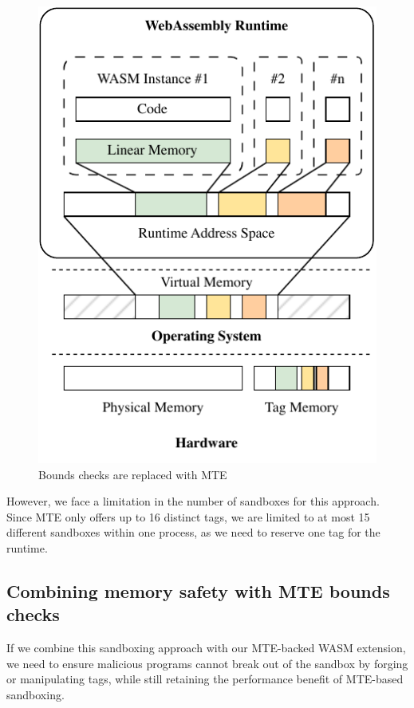 \begin{figure}[t]
    \centering
    \includegraphics[scale=1]{figures/build/system-design-1}
    \caption{Bounds checks are replaced with MTE}
    \label{fig:system-design-sandboxing}
\end{figure}

However, we face a limitation in the number of sandboxes for this approach.
Since \ac{MTE} only offers up to 16 distinct tags, we are limited to at most 15 different sandboxes within one process, as we need to reserve one tag for the runtime.

\subsection{Combining memory safety with MTE bounds checks}
\label{subsec:combining-memory-safety-with-mte-bounds-checks}

If we combine this sandboxing approach with our \ac{MTE}-backed \ac{WASM} extension, we need to ensure malicious programs cannot break out of the sandbox by forging or manipulating tags, while still retaining the performance benefit of \ac{MTE}-based sandboxing.

